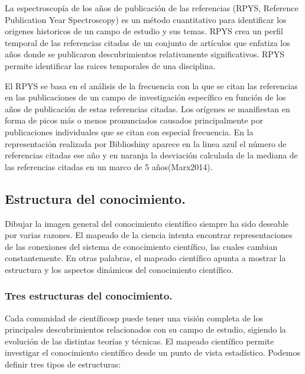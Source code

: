 \documentclass[
]{article}
\begin{document}
La espectroscopía de los años de publicación de las referencias (RPYS,
Reference Publication Year Spectroscopy) es un método cuantitativo para
identificar los origenes historicos de un campo de estudio y sus temas.
RPYS crea un perfil temporal de las referencias citadas de un conjunto
de artículos que enfatiza los años donde se publicaron descubrimientos
relativamente significativos. RPYS permite identificar las raices
temporales de una disciplina.

El RPYS se basa en el análisis de la frecuencia con la que se citan las
referencias en las publicaciones de un campo de investigación específico
en función de los años de publicación de estas referencias citadas. Los
orígenes se manifiestan en forma de picos más o menos pronunciados
causados principalmente por publicaciones individuales que se citan con
especial frecuencia. En la representación realizada por Biblioshiny
aparece en la linea azul el número de referencias citadas ese año y en
naranja la desviación calculada de la mediana de las referencias citadas
en un marco de 5 años(Marx2014).

\hypertarget{estructura-del-conocimiento.}{%
\subsection{Estructura del
conocimiento.}\label{estructura-del-conocimiento.}}

Dibujar la imagen general del conocimiento científico siempre ha sido
deseable por varias razones. El mapeado de la ciencia intenta encontrar
representaciones de las conexiones del sistema de conocimiento
científico, las cuales cambian constantemente. En otras palabras, el
mapeado científico apunta a mostrar la estructura y los aspectos
dinámicos del conocimiento científico.

\hypertarget{tres-estructuras-del-conocimiento.}{%
\subsubsection{Tres estructuras del
conocimiento.}\label{tres-estructuras-del-conocimiento.}}

Cada comunidad de científicosp puede tener una visión completa de los
principales descubrimientos relacionados con su campo de estudio,
sigiendo la evolución de las distintas teorías y técnicas. El mapeado
científico permite investigar el conocimiento científico desde un punto
de vista estadístico. Podemos definir tres tipos de estructuras:
\end{document}
